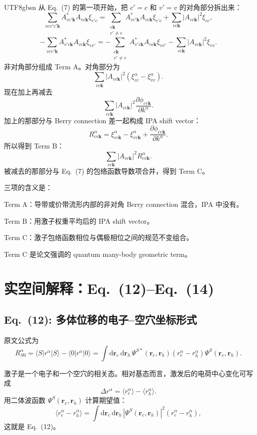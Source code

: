 \documentclass[11pt,a4paper]{article}
\newcommand{\dd}{\mathrm{d}}
\begin{document}
\begin{CJK}{UTF8}{gbsn}
从 Eq.~(7) 的第一项开始，把 $c'=c$ 和 $v'=v$ 的对角部分拆出来：
\[
\sum_{vcv'c'\bm k}
A^*_{vc'\bm k}A_{vc\bm k}\xi_{c'c}
=
\sum_{\substack{v\bm k\\c'\ne c}}
A^*_{vc'\bm k}A_{vc\bm k}\xi_{c'c}
+\sum_{vc\bm k}|A_{vc\bm k}|^2\xi_{cc},
\]
\[
-\sum_{vcv'\bm k}
A^*_{v'c\bm k}A_{vc\bm k}\xi_{vv'}
=
-\sum_{\substack{c\bm k\\v'\ne v}}
A^*_{v'c\bm k}A_{vc\bm k}\xi_{vv'}
-\sum_{vc\bm k}|A_{vc\bm k}|^2\xi_{vv}.
\]
非对角部分组成 Term A。对角部分为
\[
\sum_{vc\bm k}|A_{vc\bm k}|^2(\xi^\alpha_{cc}-\xi^\alpha_{vv}).
\]
现在加上再减去
\[
\sum_{vc\bm k}|A_{vc\bm k}|^2
\frac{\partial\phi_{cv\bm k}}{\partial k^\alpha}.
\]
加上的那部分与 Berry connection 差一起构成 IPA shift vector：
\[
R^\alpha_{cv\bm k}
=\xi^\alpha_{cc\bm k}-\xi^\alpha_{vv\bm k}
+\frac{\partial\phi_{cv\bm k}}{\partial k^\alpha}.
\]
所以得到 Term B：
\[
\sum_{vc\bm k}|A_{vc\bm k}|^2R^\alpha_{cv\bm k}.
\]
被减去的那部分与 Eq.~(7) 的包络函数导数项合并，得到 Term C。

三项的含义是：

Term A：导带或价带流形内部的非对角 Berry connection 混合，IPA 中没有。

Term B：用激子权重平均后的 IPA shift vector。

Term C：激子包络函数相位与偶极相位之间的规范不变组合。

Term C 是论文强调的 quantum many-body geometric term。

\section{实空间解释：Eq.~(12)--Eq.~(14)}

\subsection*{Eq.~(12): 多体位移的电子--空穴坐标形式}

原文公式为
\begin{equation}
R^\alpha_{S0}
=\langle S|r^\alpha|S\rangle-\langle 0|r^\alpha|0\rangle
=\int \dd\bm r_e\,\dd\bm r_h\,
\Psi^{S*}(\bm r_e,\bm r_h)
\left(r^\alpha_e-r^\alpha_h\right)
\Psi^S(\bm r_e,\bm r_h).
\tag{12}
\end{equation}

激子是一个电子和一个空穴的相关态。相对基态而言，激发后的电荷中心变化可写成
\[
\Delta r^\alpha
=\langle r^\alpha_e\rangle-\langle r^\alpha_h\rangle.
\]
用二体波函数 $\Psi^S(\bm r_e,\bm r_h)$ 计算期望值：
\[
\langle r^\alpha_e-r^\alpha_h\rangle
=\int \dd\bm r_e\,\dd\bm r_h\,
|\Psi^S(\bm r_e,\bm r_h)|^2
(r^\alpha_e-r^\alpha_h),
\]
这就是 Eq.~(12)。


\end{CJK}
\end{document}
